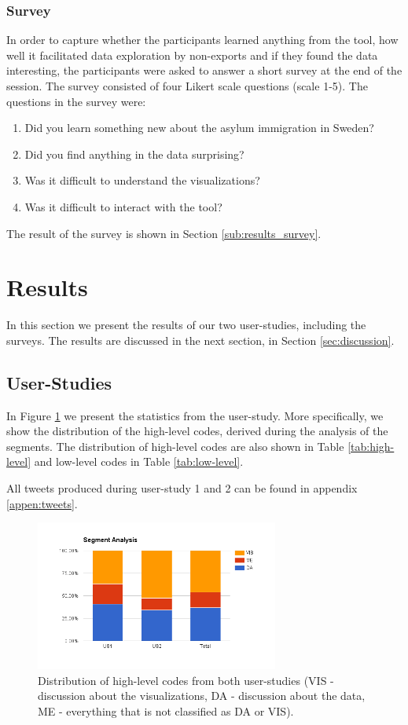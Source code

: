 \documentclass{acmtog} %
\begin{document}
\subsubsection{Survey}
\label{subsub:survey}
In order to capture whether the participants learned anything from the tool, how well it facilitated data exploration by non-exports and if they found the data interesting, the participants were asked to answer a short survey at the end of the session. The survey consisted of four Likert scale questions (scale 1-5). The questions in the survey were:
\begin{enumerate}
\item Did you learn something new about the asylum immigration in Sweden?
\item Did you find anything in the data surprising?
\item Was it difficult to understand the visualizations?
\item Was it difficult to interact with the tool?
\end{enumerate}
The result of the survey is shown in Section \ref{sub:results_survey}.

\section{Results}
\label{sec:results}
In this section we present the results of our two user-studies, including the surveys. The results are discussed in the next section, in Section \ref{sec:discussion}.

\subsection{User-Studies}
\label{sub:results_user_studies}

In Figure \ref{fig:segments} we present the statistics from the user-study. More specifically, we show the distribution of the high-level codes, derived during the analysis of the segments. The distribution of high-level codes are also shown in Table \ref{tab:high-level} and low-level codes in Table \ref{tab:low-level}. 

All tweets produced during user-study 1 and 2 can be found in appendix \ref{appen:tweets}.

\begin{figure}[!ht]
\centering
\includegraphics[width=8cm]{img/segments.png}
\caption{Distribution of high-level codes from both user-studies (VIS - discussion about the visualizations, DA - discussion about the data, ME - everything that is not classified as DA or VIS).}
\label{fig:segments}
\end{figure}
\end{document}
